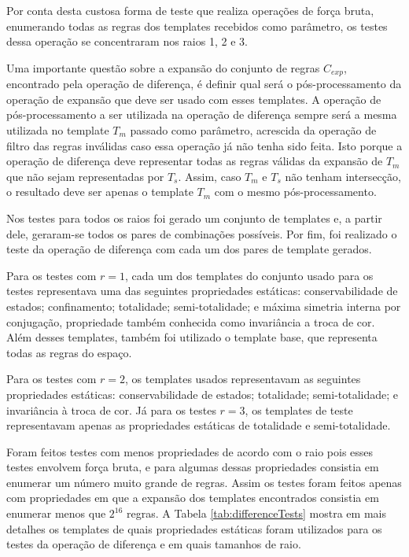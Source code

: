 Por conta desta custosa forma de teste que realiza operações de força bruta, enumerando todas as regras dos templates recebidos como parâmetro, os testes dessa operação se concentraram nos raios 1, 2 e 3.

Uma importante questão sobre a expansão do conjunto de regras $C_{exp}$, encontrado pela operação de diferença, é definir qual será o pós-processamento da operação de expansão que deve ser usado com esses templates. A operação de pós-processamento a ser utilizada na operação de diferença sempre será a mesma utilizada no template $T_m$ passado como parâmetro, acrescida da operação de filtro das regras inválidas caso essa operação já não tenha sido feita. Isto porque a operação de diferença deve representar todas as regras válidas da expansão de $T_m$ que não sejam representadas por $T_s$. Assim, caso $T_m$ e $T_s$ não tenham intersecção, o resultado deve ser apenas o template $T_m$ com o mesmo pós-processamento.

Nos testes para todos os raios foi gerado um conjunto de templates e, a partir dele, geraram-se todos os pares de combinações possíveis. Por fim, foi realizado o teste da operação de diferença com cada um dos pares de template gerados.

Para os testes com $r = 1$, cada um dos templates do conjunto usado para os testes representava uma das seguintes propriedades estáticas: conservabilidade de estados; confinamento; totalidade; semi-totalidade; e máxima simetria interna por conjugação, propriedade também conhecida como invariância a troca de cor. Além desses templates, também foi utilizado o template base, que representa todas as regras do espaço.

Para os testes com $r = 2$, os templates usados representavam as seguintes propriedades estáticas: conservabilidade de estados; totalidade; semi-totalidade; e invariância à troca de cor. Já para os testes $r = 3$, os templates de teste representavam apenas as propriedades estáticas de totalidade e semi-totalidade. 

Foram feitos testes com menos propriedades de acordo com o raio pois esses testes envolvem força bruta, e para algumas dessas propriedades consistia em enumerar um número muito grande de regras. Assim os testes foram feitos apenas com propriedades em que a expansão dos templates encontrados consistia em enumerar menos que $2^{16}$ regras. A Tabela \ref{tab:differenceTests} mostra em mais detalhes os templates de quais propriedades estáticas foram utilizados para os testes da operação de diferença e em quais tamanhos de raio.

